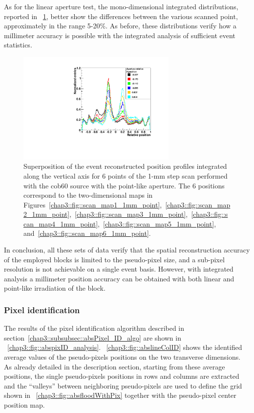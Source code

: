As for the linear aperture test, the mono-dimensional integrated distributions, reported in \figurename~\ref{chap3::fig::profilesSuper_point}, better show the differences between the various scanned point, approximately in the range 5-20\%. As before, these distributions verify how a millimeter accuracy is possible with the integrated analysis of sufficient event statistics.

\begin{figure} [!h]
\centering
\includegraphics[width=0.7\textwidth]{03_GraphicFiles/chapter3_CLaRySproto/Absorber/images_scan/point_1mm/superpositionProfiles_point.pdf}
\caption{Superposition of the event reconstructed position profiles integrated along the vertical axis for 6 points of the 1-mm step scan performed with the \gls{cob60} source with the point-like aperture. The 6 positions correspond to the two-dimensional maps in Figures~\ref{chap3::fig::scan_map1_1mm_point},~\ref{chap3::fig::scan_map2_1mm_point},~\ref{chap3::fig::scan_map3_1mm_point},~\ref{chap3::fig::scan_map4_1mm_point},~\ref{chap3::fig::scan_map5_1mm_point}, and~\ref{chap3::fig::scan_map6_1mm_point}.}
\label{chap3::fig::profilesSuper_point}
\end{figure} 

In conclusion, all these sets of data verify that the spatial reconstruction accuracy of the employed blocks is limited to the pseudo-pixel size, and a sub-pixel resolution is not achievable on a single event basis.  However, with integrated analysis a millimeter position accuracy can be obtained with both linear and point-like irradiation of the block. 

\subsubsection{Pixel identification}\label{chap3::subsubsec::absPixelID}

The results of the pixel identification algorithm described in section~\ref{chap3::subsubsec::absPixel_ID_algo} are shown in \figurename~\ref{chap3::fig::abspixID_analysis}. \figurename~\ref{chap3::fig::abslineColID} shows the identified average values of the pseudo-pixels positions on the two transverse dimensions. As already detailed in the description section, starting from these average positions, the single pseudo-pixels positions in rows and columns are extracted and the \enquote{valleys} between neighboring pseudo-pixels are used to define the grid shown in \figurename~\ref{chap3::fig::absfloodWithPix} together with the pseudo-pixel center position map.


